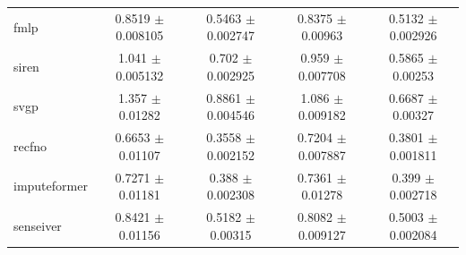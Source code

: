 \documentclass[letterpaper,9pt]{article}
\begin{document}
\begin{table}[htbp]
{\begin{tabular}{lcccc}
fmlp 
& 0.8519 $\pm$ 0.008105
& 0.5463 $\pm$ 0.002747
& 0.8375 $\pm$ 0.00963
& 0.5132 $\pm$ 0.002926 \\

siren 
& 1.041 $\pm$ 0.005132
& 0.702 $\pm$ 0.002925
& 0.959 $\pm$ 0.007708
& 0.5865 $\pm$ 0.00253 \\

svgp 
& 1.357 $\pm$ 0.01282
& 0.8861 $\pm$ 0.004546
& 1.086 $\pm$ 0.009182
& 0.6687 $\pm$ 0.00327 \\

recfno 
& 0.6653 $\pm$ 0.01107
& 0.3558 $\pm$ 0.002152
& 0.7204 $\pm$ 0.007887
& 0.3801 $\pm$ 0.001811 \\

imputeformer 
& 0.7271 $\pm$ 0.01181
& 0.388 $\pm$ 0.002308
& 0.7361 $\pm$ 0.01278
& 0.399 $\pm$ 0.002718 \\

senseiver 
& 0.8421 $\pm$ 0.01156
& 0.5182 $\pm$ 0.00315
& 0.8082 $\pm$ 0.009127
& 0.5003 $\pm$ 0.002084 \\

\hline
\end{tabular}%
}
\end{table}
\end{document}
